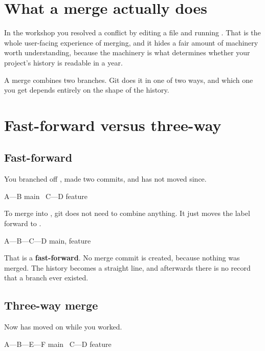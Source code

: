 \documentclass[11pt]{article}
\begin{document}
\maketitlepage

\section{What a merge actually does}

In the workshop you resolved a conflict by editing a file and running .
That is the whole user-facing experience of merging, and it hides a fair amount of
machinery worth understanding, because the machinery is what determines whether your
project's history is readable in a year.

A merge combines two branches. Git does it in one of two ways, and which one you get
depends entirely on the shape of the history.

\section{Fast-forward versus three-way}

\subsection{Fast-forward}

You branched off , made two commits, and  has not moved since.

\begin{terminal}
A---B  main
     \
      C---D  feature
\end{terminal}

To merge  into , git does not need to combine anything. It just
moves the \co{main} label forward to \co{D}.

\begin{terminal}
A---B---C---D  main, feature
\end{terminal}

That is a \textbf{fast-forward}. No merge commit is created, because nothing was
merged. The history becomes a straight line, and afterwards there is no record that
a branch ever existed.

\subsection{Three-way merge}

Now  has moved on while you worked.

\begin{terminal}
A---B---E---F  main
     \
      C---D  feature
\end{terminal}
\end{document}
